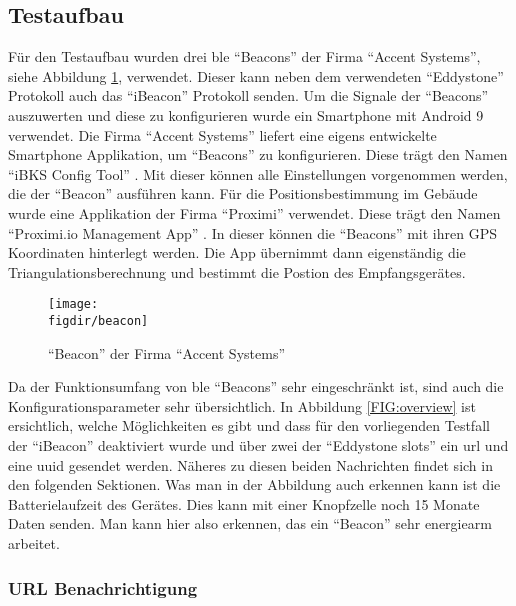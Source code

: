 \subsection{Testaufbau}
\label{ss:ibeacon:kommunikation}

Für den Testaufbau wurden drei \ac{ble} "`Beacons"' der Firma "`Accent Systems"', siehe Abbildung \ref{FIG:beacon}, verwendet. Dieser kann neben dem verwendeten "`Eddystone"' Protokoll auch das "`iBeacon"' Protokoll senden. Um die Signale der "`Beacons"' auszuwerten und diese zu konfigurieren wurde ein Smartphone mit Android 9 verwendet. Die Firma "`Accent Systems"' liefert eine eigens entwickelte Smartphone Applikation, um "`Beacons"' zu konfigurieren. Diese trägt den Namen "`iBKS Config Tool"' \cite{BKS:WWW}. Mit dieser können alle Einstellungen vorgenommen werden, die der "`Beacon"' ausführen kann. Für die Positionsbestimmung im Gebäude wurde eine Applikation der Firma "`Proximi"' verwendet. Diese trägt den Namen "`Proximi.io Management App"' \cite{PRX:WWW}. In dieser können die "`Beacons"' mit ihren GPS Koordinaten hinterlegt werden. Die App übernimmt dann eigenständig die Triangulationsberechnung und bestimmt die Postion des Empfangsgerätes.\\ 

\begin{figure}[h]
	\centering
	\texttt{[image: \\figdir/beacon]}
	\caption{"`Beacon"' der Firma "`Accent Systems"'}
	\label{FIG:beacon}
\end{figure}

\noindent Da der Funktionsumfang von \ac{ble} "`Beacons"' sehr eingeschränkt ist, sind auch die Konfigurationsparameter sehr übersichtlich. In Abbildung \ref{FIG:overview} ist ersichtlich, welche Möglichkeiten es gibt und dass für den vorliegenden Testfall der "`iBeacon"' deaktiviert wurde und über zwei der "`Eddystone slots"' ein \ac{url} und eine \ac{uuid} gesendet werden. Näheres zu diesen beiden Nachrichten findet sich in den folgenden Sektionen. Was man in der Abbildung auch erkennen kann ist die Batterielaufzeit des Gerätes. Dies kann mit einer Knopfzelle noch 15 Monate Daten senden. Man kann hier also erkennen, das ein "`Beacon"' sehr energiearm arbeitet.\\

\subsubsection{URL Benachrichtigung}
\label{sss:ibeacon:url}

